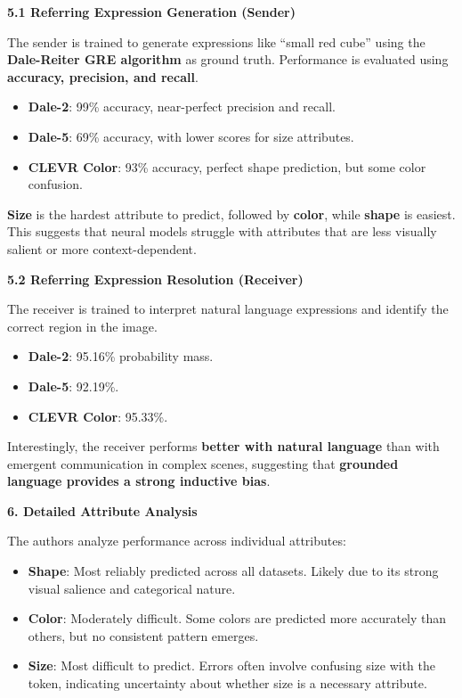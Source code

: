 \documentclass[11pt]{article}
\def\tightlist{} %
\begin{document}
\textbf{5.1 Referring Expression Generation (Sender)}

The sender is trained to generate expressions like ``small red cube''
using the \textbf{Dale-Reiter GRE algorithm} as ground truth.
Performance is evaluated using \textbf{accuracy, precision, and recall}.

\begin{itemize}
\tightlist
\item
  \textbf{Dale-2}: 99\% accuracy, near-perfect precision and recall.
\item
  \textbf{Dale-5}: 69\% accuracy, with lower scores for size attributes.
\item
  \textbf{CLEVR Color}: 93\% accuracy, perfect shape prediction, but
  some color confusion.
\end{itemize}

\textbf{Size} is the hardest attribute to predict, followed by
\textbf{color}, while \textbf{shape} is easiest. This suggests that
neural models struggle with attributes that are less visually salient or
more context-dependent.

\textbf{5.2 Referring Expression Resolution (Receiver)}

The receiver is trained to interpret natural language expressions and
identify the correct region in the image.

\begin{itemize}
\tightlist
\item
  \textbf{Dale-2}: 95.16\% probability mass.
\item
  \textbf{Dale-5}: 92.19\%.
\item
  \textbf{CLEVR Color}: 95.33\%.
\end{itemize}

Interestingly, the receiver performs \textbf{better with natural
language} than with emergent communication in complex scenes, suggesting
that \textbf{grounded language provides a strong inductive bias}.

\textbf{6. Detailed Attribute Analysis}

The authors analyze performance across individual attributes:

\begin{itemize}
\tightlist
\item
  \textbf{Shape}: Most reliably predicted across all datasets. Likely
  due to its strong visual salience and categorical nature.
\item
  \textbf{Color}: Moderately difficult. Some colors are predicted more
  accurately than others, but no consistent pattern emerges.
\item
  \textbf{Size}: Most difficult to predict. Errors often involve
  confusing size with the token, indicating uncertainty about whether
  size is a necessary attribute.
\end{itemize}
\end{document}
